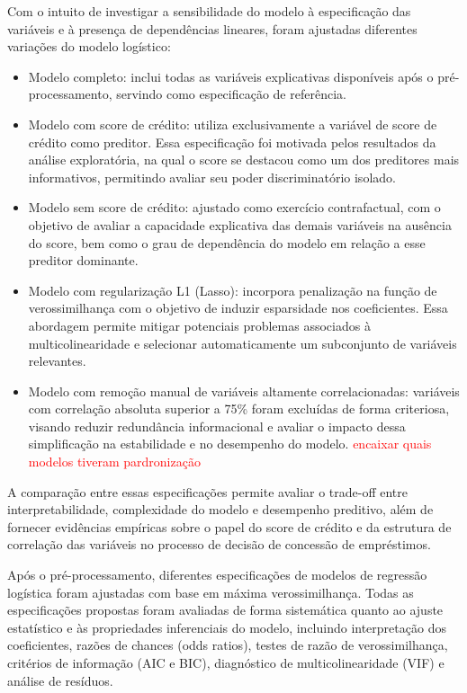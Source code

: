 \documentclass[
  brazilian,
  12pt,
  letterpaper,
  DIV=11,
  numbers=noendperiod]{scrartcl}
\providecommand{\tightlist}{%
  \setlength{\itemsep}{0pt}\setlength{\parskip}{0pt}}
\newcommand{\red}[1]{\textcolor{red}{#1}}
\begin{document}
Com o intuito de investigar a sensibilidade do modelo à especificação
das variáveis e à presença de dependências lineares, foram ajustadas
diferentes variações do modelo logístico:

\begin{itemize}
\tightlist
\item
  Modelo completo: inclui todas as variáveis explicativas disponíveis
  após o pré-processamento, servindo como especificação de referência.
\item
  Modelo com score de crédito: utiliza exclusivamente a variável de
  score de crédito como preditor. Essa especificação foi motivada pelos
  resultados da análise exploratória, na qual o score se destacou como
  um dos preditores mais informativos, permitindo avaliar seu poder
  discriminatório isolado.
\item
  Modelo sem score de crédito: ajustado como exercício contrafactual,
  com o objetivo de avaliar a capacidade explicativa das demais
  variáveis na ausência do score, bem como o grau de dependência do
  modelo em relação a esse preditor dominante.
\item
  Modelo com regularização L1 (Lasso): incorpora penalização na função
  de verossimilhança com o objetivo de induzir esparsidade nos
  coeficientes. Essa abordagem permite mitigar potenciais problemas
  associados à multicolinearidade e selecionar automaticamente um
  subconjunto de variáveis relevantes.
\item
  Modelo com remoção manual de variáveis altamente correlacionadas:
  variáveis com correlação absoluta superior a 75\% foram excluídas de
  forma criteriosa, visando reduzir redundância informacional e avaliar
  o impacto dessa simplificação na estabilidade e no desempenho do
  modelo. \red{ encaixar quais modelos tiveram pardronização}
\end{itemize}

A comparação entre essas especificações permite avaliar o trade-off
entre interpretabilidade, complexidade do modelo e desempenho preditivo,
além de fornecer evidências empíricas sobre o papel do score de crédito
e da estrutura de correlação das variáveis no processo de decisão de
concessão de empréstimos.

Após o pré-processamento, diferentes especificações de modelos de
regressão logística foram ajustadas com base em máxima verossimilhança.
Todas as especificações propostas foram avaliadas de forma sistemática
quanto ao ajuste estatístico e às propriedades inferenciais do modelo,
incluindo interpretação dos coeficientes, razões de chances (odds
ratios), testes de razão de verossimilhança, critérios de informação
(AIC e BIC), diagnóstico de multicolinearidade (VIF) e análise de
resíduos.
\end{document}
